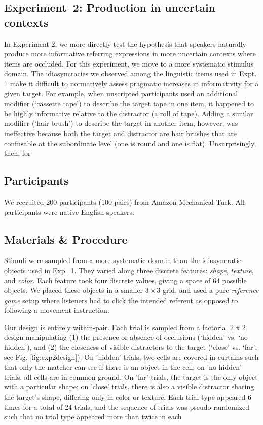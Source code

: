 \documentclass[manuscript]{stjour}
\begin{document}
\subsection{Experiment~2: Production in uncertain contexts}
\label{sec:Exp2}

In Experiment 2, we more directly test the hypothesis that speakers naturally produce more informative referring expressions in more uncertain contexts where items are occluded. For this experiment, we move to a more systematic stimulus domain. The idiosyncracies we observed among the linguistic items used in Expt. 1 make it difficult to normatively assess pragmatic increases in informativity for a given target. For example, when unscripted participants used an additional modifier (`cassette tape') to describe the target tape in one item, it happened to be highly informative relative to the distractor (a roll of tape). Adding a similar modifier (`hair brush') to describe the target in another item, however, was ineffective because both the target and distractor are hair brushes that are confusable at the subordinate level (one is round and one is flat). Unsurprisingly, then, for 


\subsection{Participants}

We recruited 200 participants (100 pairs) from Amazon Mechanical Turk. All participants were native English speakers. 

\subsection{Materials \& Procedure}

Stimuli were sampled from a more systematic domain than the idiosyncratic objects used in Exp.~1. They varied along three discrete features: \emph{shape}, \emph{texture}, and \emph{color}. Each feature took four discrete values, giving a space of 64 possible objects. We placed these objects in a smaller $3 \times 3$ grid, and used a pure \emph{reference game} setup where listeners had to click the intended referent as opposed to following a movement instruction. 

Our design is entirely within-pair. Each trial is sampled from a factorial 2 x 2 design manipulating (1) the presence or absence of occlusions (`hidden' vs. `no hidden'), and (2) the closeness of visible distractors to the target (`close' vs. `far'; see Fig. \ref{fig:exp2design}). On 'hidden' trials, two cells are covered in curtains such that only the matcher can see if there is an object in the cell; on 'no hidden' trials, all cells are in common ground. On 'far' trials, the target is the only object with a particular shape; on 'close' trials, there is also a visible distractor sharing the target's shape, differing only in color or texture. Each trial type appeared 6 times for a total of 24 trials, and the sequence of trials was pseudo-randomized such that no trial type appeared more than twice in each 
\end{document}
